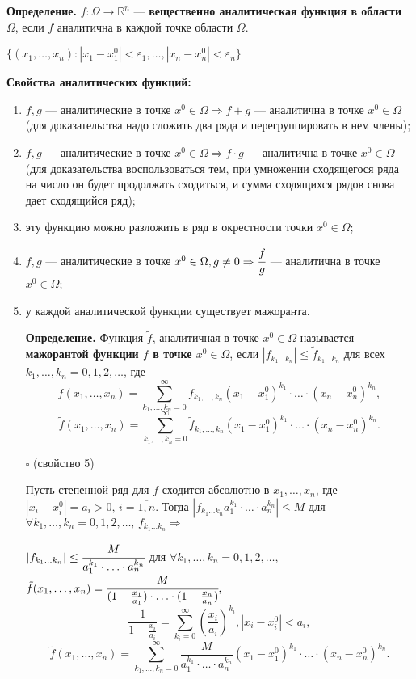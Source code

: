 \documentclass[12pt,a4paper,draft]{article}
\DeclareRobustCommand*{\т}{~--- }
\DeclareRobustCommand*{\ч}{~-- }
\begin{document}
\textbf{Определение.} $f\colon \Omega \to \mathbb R^n$ ---
\textbf{вещественно аналитическая функция в области $\Omega$},
если $f$ аналитична в каждой точке области $\Omega$.

$\{(x_1,\ldots,x_n)\colon
|x_1-x_1^0|<\varepsilon_1,\ldots,|x_n-x_n^0|<\varepsilon_n\}$

\textbf{Свойства аналитических функций:}
\begin{enumerate}
    \item $f,g$ --- аналитические в точке $x^0\in\Omega \Rightarrow
    f+g$ --- аналитична в точке $x^0\in\Omega$ (для доказательства надо сложить два ряда и перегруппировать в нем
    члены);
    \item $f,g$ --- аналитические в точке $x^0\in\Omega \Rightarrow
    f\cdot g$ --- аналитична в точке $x^0\in\Omega$ (для доказательства воспользоваться тем, при умножении сходящегося ряда на число он будет продолжать сходиться, и сумма сходящихся рядов снова дает сходящийся ряд);
    \item эту функцию можно разложить в ряд в окрестности точки
    $x^0\in\Omega$;
    \item $f,g$ --- аналитические в точке $x^0\in\Omega, g\ne0 \Rightarrow
    \cfrac fg$ --- аналитична в точке $x^0\in\Omega$;
    \item у каждой аналитической функции существует мажоранта.


\textbf{Определение.} Функция $\tilde f$, аналитичная в точке
$x^0\in\Omega$ называется \textbf{мажорантой функции $f$ в точке
$x^0\in\Omega$}, если $|f_{k_1\ldots k_n}|\le \tilde f_{k_1\ldots
k_n}$ для всех $k_1,\ldots,k_n=0,1,2,\ldots$, где
$$f(x_1,\ldots,x_n)=\sum_{k_1,\ldots,k_n=0}^{\infty}f_{k_1,\ldots,k_n}(x_1-x_1^0)^{k_1}\cdot\ldots\cdot(x_n-x_n^0)^{k_n},$$
$$\tilde f(x_1,\ldots,x_n)=\sum_{k_1,\ldots,k_n=0}^{\infty}\tilde
f_{k_1,\ldots,k_n}(x_1-x_1^0)^{k_1}\cdot\ldots\cdot(x_n-x_n^0)^{k_n}.$$

$\square$ (свойство 5)

Пусть степенной ряд для $f$ сходится абсолютно в $x_1,\ldots,x_n$,
где $|x_i-x_i^0|=a_i>0,\,i=\overline{1,n}.$ Тогда $|f_{k_1\ldots
k_n}a_1^{k_1}\cdot\ldots\cdot a_n^{k_n}|\le M$ для $\forall
k_1,\ldots,k_n=0,1,2,\ldots,\,f_{k_1\ldots k_n} \Rightarrow$

$|f_{k_1\ldots k_n}|\le\cfrac M{a_1^{k_1}\cdot\ldots\cdot
a_n^{k_n}}$ для $\forall k_1,\ldots,k_n=0,1,2,\ldots,$ $\tilde
f(x_1,\ldots,x_n)=\cfrac M{(1-\frac{x_1}{a_1})\cdot\ldots\cdot
(1-\frac{x_n}{a_n})},$
$$\frac1{1-\frac{x_i}{a_i}}=\sum_{k_i=0}^{\infty}\left(\frac{x_i}{a_i}\right)^{k_i}, |x_i-x_i^0|<a_i,$$
$$\tilde f(x_1,\ldots,x_n)=\sum_{k_1,\ldots,k_n=0}^{\infty}\frac M{a_1^{k_1}\cdot\ldots\cdot
a_n^{k_n}}(x_1-x_1^0)^{k_1}\cdot\ldots\cdot(x_n-x_n^0)^{k_n}.$$


\end{enumerate}
\end{document}
